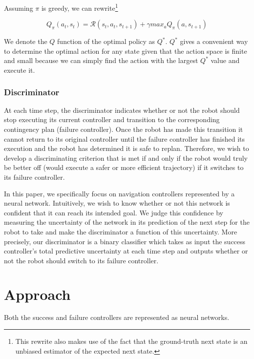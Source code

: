 \documentclass[letterpaper]{article}
\begin{document}
				Assuming $\pi$ is greedy, we can rewrite\footnote{This rewrite also makes use of the fact that the ground-truth next state is an unbiased estimator of the expected next state.}
				
				\begin{equation}\label{eq:simplebellmanexpect}
					Q_{\pi}(a_t, s_t) = \mathcal{R}(s_t, a_t, s_{t+1}) + \gamma max_a Q_{\pi}(a, s_{t+1})
				\end{equation}
				
				We denote the $Q$ function of the optimal policy as $Q^*$. $Q^*$ gives a convenient way to determine the optimal action for any state given that the action space is finite and small because we can simply find the action with the largest $Q^*$ value and execute it.
				
			\subsubsection{Discriminator}
				At each time step, the discriminator indicates whether or not the robot should stop executing its current controller and transition to the corresponding contingency plan (failure controller). Once the robot has made this transition it cannot return to its original controller until the failure controller has finished its execution and the robot has determined it is safe to replan. Therefore, we wish to develop a discriminating criterion that is met if and only if the robot would truly be better off (would execute a safer or more efficient trajectory) if it switches to its failure controller.
				
				In this paper, we specifically focus on navigation controllers represented by a neural network. Intuitively, we wish to know whether or not this network is confident that it can reach its intended goal. We judge this confidence by measuring the uncertainty of the network in its prediction of the next step for the robot to take and make the discriminator a function of this uncertainty. More precisely, our discriminator is a binary classifier which takes as input the success controller's total predictive uncertainty at each time step and outputs whether or not the robot should switch to its failure controller.
	\section{Approach}\label{sec:approach}
			Both the success and failure controllers are represented as neural networks. 
			
\end{document}
